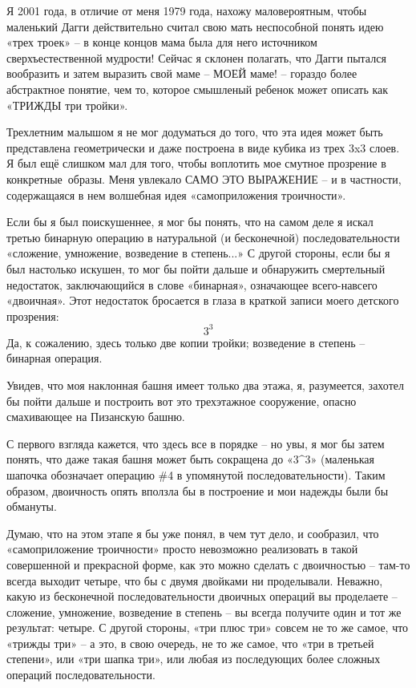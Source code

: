 \documentclass[../main.tex]{subfiles}
\begin{document}
Я 2001 года, в отличие от меня 1979 года, нахожу маловероятным, чтобы маленький Дагги действительно считал свою мать неспособной понять идею «трех троек» \--- в конце концов мама была для него источником сверхъестественной мудрости!
Сейчас я склонен полагать, что Дагги пытался вообразить и затем выразить свой маме \--- МОЕЙ маме! \--- гораздо более абстрактное понятие, чем то, которое смышленый ребенок может описать как «ТРИЖДЫ три тройки».

Трехлетним малышом я не мог додуматься до того, что эта идея может быть представлена геометрически и даже построена в виде кубика из трех 3x3 слоев.
Я был ещё слишком мал для того, чтобы воплотить мое смутное прозрение в конкретные~образы.
Меня увлекало САМО ЭТО ВЫРАЖЕНИЕ \--- и в частности, содержащаяся в нем волшебная идея «самоприложения троичности».

Если бы я был поискушеннее, я мог бы понять, что на самом деле я искал третью бинарную операцию в натуральной (и бесконечной) последовательности «сложение, умножение, возведение в степень...»
С другой стороны, если бы я был настолько искушен, то мог бы пойти дальше и обнаружить смертельный недостаток, заключающийся в слове «бинарная», означающее всего-навсего «двоичная».
Этот недостаток бросается в глаза в краткой записи моего детского прозрения:
\[
    3^3
\]
Да, к сожалению, здесь только две копии тройки; возведение в степень \--- бинарная операция.

Увидев, что моя наклонная башня имеет только два этажа, я, разумеется, захотел бы пойти дальше и построить вот это трехэтажное сооружение, опасно смахивающее на Пизанскую башню.

С первого взгляда кажется, что здесь все в порядке \--- но увы, я мог бы затем понять, что даже такая башня может быть сокращена до «$3 \text{\textasciicircum} 3$» (маленькая шапочка обозначает операцию \#4 в упомянутой последовательности).
Таким образом, двоичность опять вползла бы в построение и мои надежды были бы обмануты.

Думаю, что на этом этапе я бы уже понял, в чем тут дело, и сообразил, что «самоприложение троичности» просто невозможно реализовать в такой совершенной и прекрасной форме, как это можно сделать с двоичностью \--- там-то всегда выходит четыре, что бы с двумя двойками ни проделывали.
Неважно, какую из бесконечной последовательности двоичных операций вы проделаете \--- сложение, умножение, возведение в степень \--- вы всегда получите один и тот же результат: четыре.
С другой стороны, «три плюс три» совсем не то же самое, что «трижды три» \--- а это, в свою очередь, не то же самое, что «три в третьей степени», или «три шапка три», или любая из последующих более сложных операций последовательности.
\end{document}

